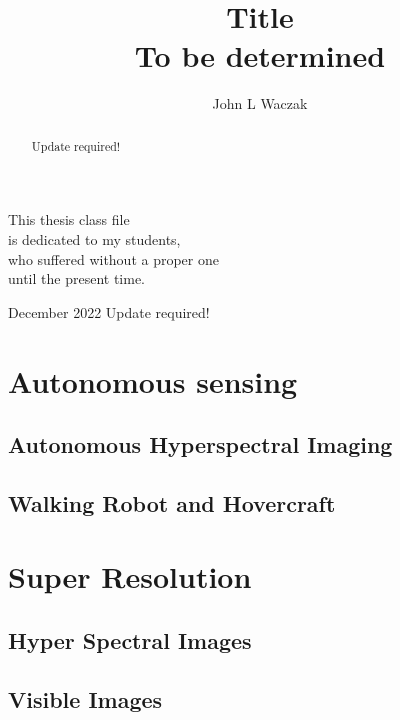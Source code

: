 \documentclass[doublespacing]{utdthesis}
\author{John L Waczak}
\title{Title \\ To be determined}
\begin{document}
\frontmatter

\signaturepage
{} %

\begin{dedication} %
This thesis class file \\
is dedicated to my students, \\
who suffered without a proper one \\
until the present time.
\end{dedication}

\maketitle

\begin{acks}{December 2022} %
  Update required!
\end{acks}

\begin{abstract}
  Update required!  
\end{abstract}

\tableofcontents
\listoffigures %
\listoftables %

\mainmatter

\chapter{Autonomous sensing}
\label{c:sensing}
\section{Autonomous Hyperspectral Imaging}
\label{s:hsi}
\section{Walking Robot and Hovercraft}
\label{s:wr}

\chapter{Super Resolution}
\label{c:super resolution}
\section{Hyper Spectral Images}
\label{s:sr with hsi}
\section{Visible Images}
\label{s:sr with visible}
\end{document}
